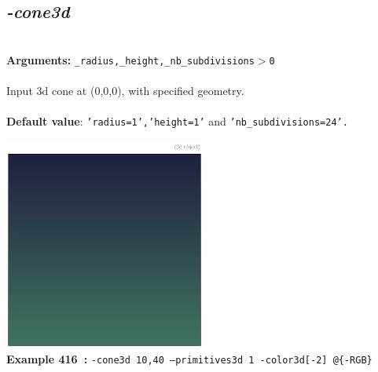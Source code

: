 \documentclass[a4paper,11pt,twoside]{book}
\begin{document}
\subsection{\emph{-cone3d} }\vspace*{-0.5em}
~\\\textbf{Arguments: } 
{\small \texttt{\_radius,\_height,\_nb\_subdivisions$>$0}}\\~\\
Input 3d cone at (0,0,0), with specified geometry.
~\\~\\\textbf{Default value}: {\small \texttt{'radius=1','height=1'} and \texttt{'nb\_subdivisions=24'.}}
\begin{center}\includegraphics[keepaspectratio=true,height=7cm,width=\textwidth]{img/gmic_def416.jpg}\\
{\footnotesize \textbf{Example 416~:} \texttt{-cone3d 10,40 --primitives3d 1 -color3d[-2] @\{-RGB\}}}
\end{center}
\end{document}
